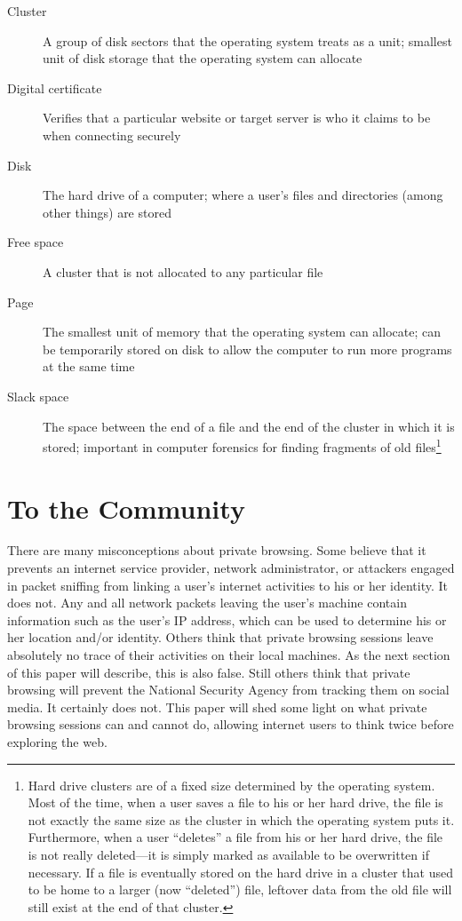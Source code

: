 \documentclass[pdftex,letterpaper,titlepage,12pt]{article}
\begin{document}
    \begin{description}
      \item[Cluster] A group of disk sectors that the operating system
      treats as a unit; smallest unit of disk storage that the operating
      system can allocate
      \item[Digital certificate] Verifies that a particular website or target
      server is who it claims to be when connecting securely
      \item[Disk] The hard drive of a computer; where a user's files and
      directories (among other things) are stored
      \item[Free space] A cluster that is not allocated to any particular 
      file
      \item[Page] The smallest unit of memory that the operating system can
      allocate; can be temporarily stored on disk to allow the computer to run
      more programs at the same time
      \item[Slack space] The space between the end of a file and the end of 
      the cluster in which it is stored; important in computer forensics for
      finding fragments of old files\footnote{Hard drive clusters are of a 
      fixed size determined by the operating system. Most of the time, when a 
      user saves a file to his or her hard drive, the file is not exactly the 
      same size as the cluster in which the operating system puts it. 
      Furthermore, when a user ``deletes'' a file from his or her hard drive, 
      the file is not really deleted---it is simply marked as available to be
      overwritten if necessary. If a file is eventually stored on the hard 
      drive in a cluster that used to be home to a larger (now ``deleted'') 
      file, leftover data from the old file will still exist at the end of that
      cluster.}
    \end{description}
    
  \section{To the Community}
  There are many misconceptions about private browsing. Some believe that it
  prevents an internet service provider, network administrator, or attackers
  engaged in packet sniffing from linking a user's internet activities to his
  or her identity. It does not. Any and all network packets leaving the user's
  machine contain information such as the user's IP address, which can be used
  to determine his or her location and/or identity. Others think that private
  browsing sessions leave absolutely no trace of their activities on their
  local machines. As the next section of this paper will describe, this is also
  false. Still others think that private browsing will prevent the National
  Security Agency from tracking them on social media. It certainly does not.
  This paper will shed some light on what private browsing sessions can and
  cannot do, allowing internet users to think twice before exploring the web.
\end{document}
